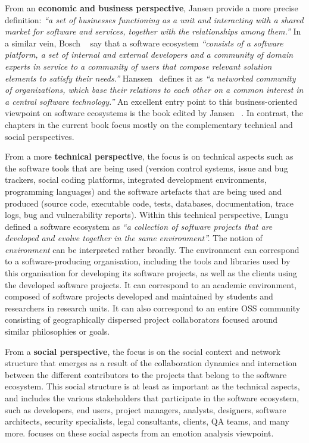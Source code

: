 From an \textbf{economic and business perspective}, Jansen \etal \cite{Jansen2009-ICSE} provide a more precise definition: \emph{``a set of businesses functioning as a unit and interacting with a shared market for software and services, together with the relationships among them.''} In a similar vein,
Bosch \etal~\cite{Bosch2009} say that a software ecosystem \emph{``consists of a software platform, a set of internal and external developers and a community of domain experts in service to a community of users that compose relevant solution elements to satisfy their needs.''}
Hanssen~\cite{Hanssen2012} defines it as \emph{``a networked community of organizations, which base their relations to each other on a common interest in a central software technology.''}
An excellent entry point to this business-oriented viewpoint on software ecosystems is the book edited by Jansen \etal~\cite{Jansen2013book}.
In contrast, the chapters in the current book focus mostly on the complementary technical and social perspectives.

From a more \textbf{technical perspective}, the focus is on technical aspects such as the software tools that are being used (\eg version control systems, issue and bug trackers, social coding platforms, integrated development environments, programming languages) and the software artefacts that are being used and produced (\eg source code, executable code, tests, databases, documentation, trace logs, bug and vulnerability reports).
Within this technical perspective, Lungu \cite{Lungu2008} defined a software ecosystem as \emph{``a collection of software projects that are developed and evolve together in the same environment''.}
The notion of \emph{environment} can be interpreted rather broadly.
The environment can correspond to a software-producing organisation, including the tools and libraries used by this organisation for developing its software projects, as well as the clients using the developed software projects.
It can correspond to an academic environment, composed of software projects developed and maintained by students and researchers in research units.
It can also correspond to an entire OSS community consisting of geographically dispersed project collaborators focused around similar philosophies or goals.

From a \textbf{social perspective}, the focus is on the social context and network structure that emerges as a result of the collaboration dynamics and interaction between the different contributors to the projects that belong to the software ecosystem.
This social structure is at least as important as the technical aspects, and includes the various stakeholders that participate in the software ecosystem, such as developers, end users, project managers, analysts, designers, software architects, security specialists, legal consultants, clients, QA teams, and many more.
 focuses on these social aspects from an emotion analysis viewpoint.

